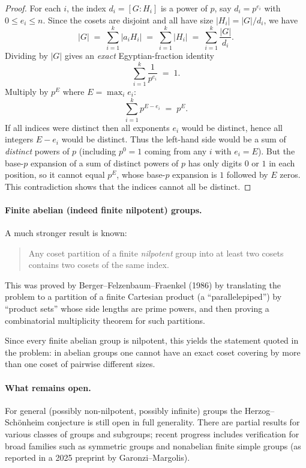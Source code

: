 \begin{proof}
For each $i$, the index $d_i=[G:H_i]$ is a power of $p$, say $d_i=p^{e_i}$ with $0\le e_i\le n$.
Since the cosets are disjoint and all have size $|H_i|=|G|/d_i$, we have
\[
|G|
\;=\;
\sum_{i=1}^k |a_iH_i|
\;=\;
\sum_{i=1}^k |H_i|
\;=\;
\sum_{i=1}^k \frac{|G|}{d_i}.
\]
Dividing by $|G|$ gives an \emph{exact} Egyptian-fraction identity
\[
\sum_{i=1}^k \frac{1}{p^{e_i}} \;=\; 1.
\]
Multiply by $p^{E}$ where $E=\max_i e_i$:
\[
\sum_{i=1}^k p^{E-e_i} \;=\; p^{E}.
\]
If all indices were distinct then all exponents $e_i$ would be distinct, hence all integers $E-e_i$ would be distinct.
Thus the left-hand side would be a sum of \emph{distinct} powers of $p$ (including $p^0=1$ coming from any $i$ with $e_i=E$).
But the base-$p$ expansion of a sum of distinct powers of $p$ has only digits $0$ or $1$ in each position, so it cannot equal $p^{E}$, whose base-$p$ expansion is $1$ followed by $E$ zeros.
This contradiction shows that the indices cannot all be distinct.
\end{proof}

\paragraph{Finite abelian (indeed finite nilpotent) groups.}
A much stronger result is known:
\begin{quote}
Any coset partition of a finite \emph{nilpotent} group into at least two cosets contains two cosets of the same index.
\end{quote}
This was proved by Berger--Felzenbaum--Fraenkel (1986) by translating the problem to a partition of a finite Cartesian product (a ``parallelepiped'') by ``product sets'' whose side lengths are prime powers, and then proving a combinatorial multiplicity theorem for such partitions.

Since every finite abelian group is nilpotent, this yields the statement quoted in the problem: in abelian groups one cannot have an exact coset covering by more than one coset of pairwise different sizes.

\paragraph{What remains open.}
For general (possibly non-nilpotent, possibly infinite) groups the Herzog--Sch\"onheim conjecture is still open in full generality.  There are partial results for various classes of groups and subgroups; recent progress includes verification for broad families such as symmetric groups and nonabelian finite simple groups (as reported in a 2025 preprint by Garonzi--Margolis).

